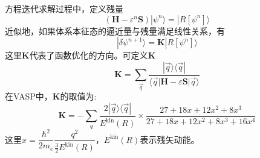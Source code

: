 \documentclass{article}      %
\begin{document}
方程迭代求解过程中，定义残量
	\begin{displaymath}
		(\mathbf{H}-\varepsilon^n\mathbf{S})|\psi^n\rangle=|R[\psi^n]\rangle
	\end{displaymath}
近似地，如果体系本征态的逼近量与残量满足线性关系，有
\begin{displaymath}
	|\delta\psi^{n+1}\rangle=\mathbf{K}|R[\psi^n]\rangle
\end{displaymath}
这里$\mathbf{K}$代表了函数优化的方向。可定义$\mathbf{K}$
\begin{equation}
	\mathbf{K}=\sum_{\vec q}\dfrac{|\vec q\rangle\langle\vec q|}{\langle\vec q|\mathbf{H}-\varepsilon\mathbf{S}|\vec q\rangle}
	\label{eq:Predict}
\end{equation}
在\textrm{VASP}中，$\mathbf{K}$的取值为:
\begin{displaymath}
	\mathbf{K}=-\sum_q\dfrac{2|\vec q\rangle\langle\vec q|}{E^{\mathrm{kin}}(R)}\times\dfrac{27+18x+12x^2+8x^3}{27+18x+12x^2+8x^3+16x^4}
\end{displaymath}
这里$x=\dfrac{\hbar^2}{2m_e}\dfrac{q^2}{\frac32E^{\mathrm{kin}}(R)}$，$E^{\mathrm{kin}}(R)$表示残矢动能。
\end{document}
